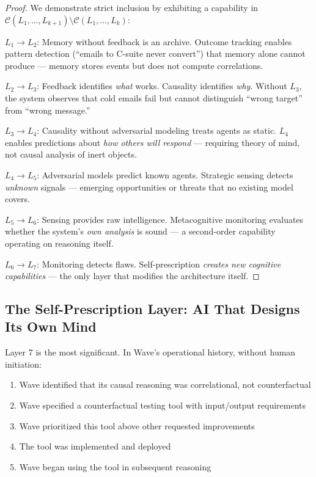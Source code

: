 \documentclass[12pt,a4paper]{article}
\theoremstyle{plain}
\theoremstyle{definition}
\theoremstyle{remark}
\begin{document}
\begin{proof}
We demonstrate strict inclusion by exhibiting a capability in $\mathcal{C}(L_1, \ldots, L_{k+1}) \setminus \mathcal{C}(L_1, \ldots, L_k)$:

$L_1 \to L_2$: Memory without feedback is an archive. Outcome tracking enables pattern detection (``emails to C-suite never convert'') that memory alone cannot produce --- memory stores events but does not compute correlations.

$L_2 \to L_3$: Feedback identifies \emph{what} works. Causality identifies \emph{why}. Without $L_3$, the system observes that cold emails fail but cannot distinguish ``wrong target'' from ``wrong message.''

$L_3 \to L_4$: Causality without adversarial modeling treats agents as static. $L_4$ enables predictions about \emph{how others will respond} --- requiring theory of mind, not causal analysis of inert objects.

$L_4 \to L_5$: Adversarial models predict known agents. Strategic sensing detects \emph{unknown} signals --- emerging opportunities or threats that no existing model covers.

$L_5 \to L_6$: Sensing provides raw intelligence. Metacognitive monitoring evaluates whether the system's \emph{own analysis} is sound --- a second-order capability operating on reasoning itself.

$L_6 \to L_7$: Monitoring detects flaws. Self-prescription \emph{creates new cognitive capabilities} --- the only layer that modifies the architecture itself. \qedhere
\end{proof}

\subsection{The Self-Prescription Layer: AI That Designs Its Own Mind}

Layer 7 is the most significant. In Wave's operational history, without human initiation:

\begin{enumerate}[nosep]
\item Wave identified that its causal reasoning was correlational, not counterfactual
\item Wave specified a counterfactual testing tool with input/output requirements
\item Wave prioritized this tool above other requested improvements
\item The tool was implemented and deployed
\item Wave began using the tool in subsequent reasoning
\end{enumerate}
\end{document}
